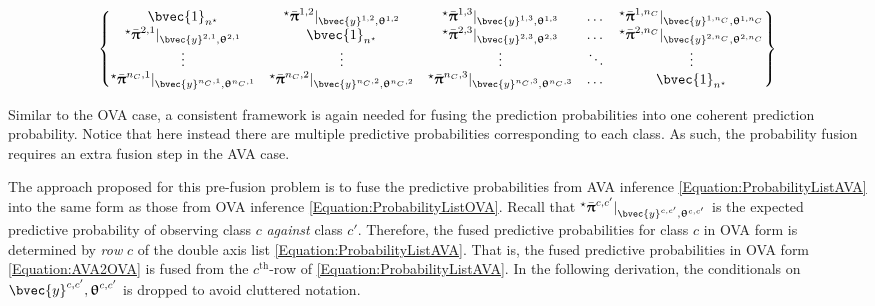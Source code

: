 				\begin{equation}
					\begin{Bmatrix*}
						\bvec{1}_{n^{\star}} & {^{\star}}\bar{\vec{\uppi}}^{1, 2} |_{\bvec{y}^{1, 2}, \vec{\uptheta}^{1, 2}} & {^{\star}}\bar{\vec{\uppi}}^{1, 3} |_{\bvec{y}^{1, 3}, \vec{\uptheta}^{1, 3}} & \dots & {^{\star}}\bar{\vec{\uppi}}^{1, n_{C}} |_{\bvec{y}^{1, n_{C}}, \vec{\uptheta}^{1, n_{C}}} \\
						{^{\star}}\bar{\vec{\uppi}}^{2, 1} |_{\bvec{y}^{2, 1}, \vec{\uptheta}^{2, 1}} & \bvec{1}_{n^{\star}} & {^{\star}}\bar{\vec{\uppi}}^{2, 3} |_{\bvec{y}^{2, 3}, \vec{\uptheta}^{2, 3}} & \dots & {^{\star}}\bar{\vec{\uppi}}^{2, n_{C}} |_{\bvec{y}^{2, n_{C}}, \vec{\uptheta}^{2, n_{C}}} \\
						\vdots & \vdots & \vdots & \ddots & \vdots \\
						{^{\star}}\bar{\vec{\uppi}}^{n_{C}, 1} |_{\bvec{y}^{n_{C}, 1}, \vec{\uptheta}^{n_{C}, 1}} & {^{\star}}\bar{\vec{\uppi}}^{n_{C}, 2} |_{\bvec{y}^{n_{C}, 2}, \vec{\uptheta}^{n_{C}, 2}} & {^{\star}}\bar{\vec{\uppi}}^{n_{C}, 3} |_{\bvec{y}^{n_{C}, 3}, \vec{\uptheta}^{n_{C}, 3}} & \dots & \bvec{1}_{n^{\star}}
					\end{Bmatrix*} 
				\label{Equation:ProbabilityListAVA}
				\end{equation}	
				
				Similar to the OVA case, a consistent framework is again needed for fusing the prediction probabilities into one coherent prediction probability. Notice that here instead there are multiple predictive probabilities corresponding to each class. As such, the probability fusion requires an extra fusion step in the AVA case. 
			
				The approach proposed for this pre-fusion problem is to fuse the predictive probabilities from AVA inference \eqref{Equation:ProbabilityListAVA} into the same form as those from OVA inference \eqref{Equation:ProbabilityListOVA}. Recall that ${^{\star}}\bar{\vec{\uppi}}^{c, c'} |_{\bvec{y}^{c, c'}, \vec{\uptheta}^{c, c'}}$ is the expected predictive probability of observing class $c$ \textit{against} class $c'$. Therefore, the fused predictive probabilities for class $c$ in OVA form is determined by \textit{row} $c$ of the double axis list \eqref{Equation:ProbabilityListAVA}. That is, the fused predictive probabilities in OVA form \eqref{Equation:AVA2OVA} is fused from the $c^{\mathrm{th}}$-row of \eqref{Equation:ProbabilityListAVA}. In the following derivation, the conditionals on $\bvec{y}^{c, c'}, \vec{\uptheta}^{c, c'}$ is dropped to avoid cluttered notation.
				
